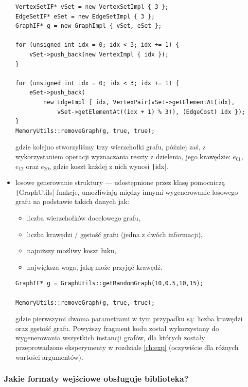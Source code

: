 \begin{itemize}
	\begin{verbatim}
VertexSetIF* vSet = new VertexSetImpl { 3 };
EdgeSetIF* eSet = new EdgeSetImpl { 3 };
GraphIF* g = new GraphImpl { vSet, eSet };

for (unsigned int idx = 0; idx < 3; idx += 1) {
	vSet->push_back(new VertexImpl { idx });
}

for (unsigned int idx = 0; idx < 3; idx += 1) {
	eSet->push_back(
		new EdgeImpl { idx, VertexPair(vSet->getElementAt(idx),
			vSet->getElementAt((idx + 1) % 3)), (EdgeCost) idx });
}
MemoryUtils::removeGraph(g, true, true);
	\end{verbatim}
	gdzie kolejno stworzyliśmy trzy wierzchołki grafu, później zaś, z wykorzystaniem operacji wyznaczania reszty z dzielenia,  jego krawędzie: $e_{01}$, $e_{12}$ oraz $e_{20}$, gdzie koszt każdej z nich wynosi \texttt|idx|.\\
	
	\item losowe generowanie struktury --- udostępnione przez klasę pomocniczą \texttt|GraphUtils| funkcje, umożliwiają między innymi wygenerowanie losowego grafu na podstawie takich danych jak:
	\begin{itemize}
		\item liczba wierzchołków docelowego grafu,
		\item liczba krawędzi / gęstość grafu (jedna z dwóch informacji),
		\item najniższy możliwy koszt łuku,
		\item największa waga, jaką może przyjąć krawędź.
	\end{itemize}

	\begin{verbatim}
GraphIF* g = GraphUtils::getRandomGraph(10,0.5,10,15);

MemoryUtils::removeGraph(g, true, true);
	\end{verbatim}
	gdzie pierwszymi dwoma parametrami w tym przypadku są: liczba krawędzi oraz gęstość grafu. Powyższy fragment kodu został wykorzystany do wygenerowania wszystkich instancji grafów, dla których zostały przeprowadzone eksperymenty w rozdziale \ref{ch:exp} (oczywiście dla różnych wartości argumentów).	
\end{itemize}

\subsubsection{Jakie formaty wejściowe obsługuje biblioteka?}

